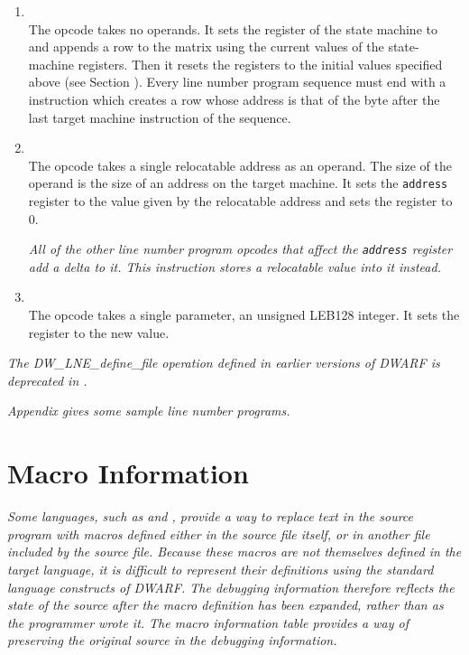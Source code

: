 \begin{enumerate}[1. ]

\item \textbf{\DWLNEendsequenceTARG} \\
The \DWLNEendsequenceNAME{} opcode takes no operands. It sets the
register of the state machine to  and
appends a row to the matrix using the current values of the
state-machine registers. Then it resets the registers to the
initial values specified above 
(see Section ). 
Every line
number program sequence must end with a \DWLNEendsequence{}
instruction which creates a row whose address is that of the
byte after the last target machine instruction of the sequence.

\item \textbf{\DWLNEsetaddressTARG} \\
The \DWLNEsetaddressNAME{} opcode takes a single relocatable
address as an operand. The size of the operand is the size
of an address on the target machine. It sets the \texttt{address}
register to the value given by the relocatable address and
sets the  register to 0.

\textit{All of the other line number program opcodes that
affect the \texttt{address} register add a delta to it. This instruction
stores a relocatable value into it instead.}

\item \textbf{\DWLNEsetdiscriminatorTARG} \\
The \DWLNEsetdiscriminatorNAME{}
opcode takes a single
parameter, an unsigned LEB128 
integer. It sets the
 register to the new value.

\end{enumerate}

\textit{The DW\_LNE\_define\_file operation defined
in earlier versions of DWARF is deprecated in \DWARFVersionV.}

\textit{Appendix  
gives some sample line number programs.}

\section{Macro Information}
\label{chap:macroinformation}
\textit{Some languages, such as 
 and 
, provide a way to replace
text in the source program with macros defined either in the
source file itself, or in another file included by the source
file.  Because these macros are not themselves defined in the
target language, it is difficult to represent their definitions
using the standard language constructs of DWARF. The debugging
information therefore reflects the state of the source after
the macro definition has been expanded, rather than as the
programmer wrote it. The macro information table provides a way
of preserving the original source in the debugging information.}

